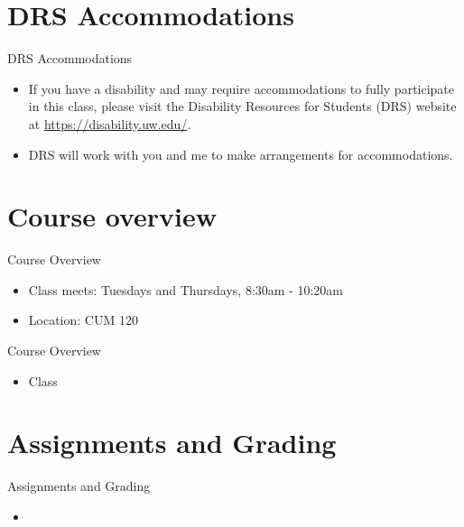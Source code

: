 \documentclass{beamer}
\begin{document}
\section{DRS Accommodations}

\begin{frame}{DRS Accommodations}
    \begin{itemize}

        \item If you have a disability and may require accommodations to fully participate in this class, please visit the Disability Resources for Students (DRS) website at \url{https://disability.uw.edu/}.
        \item DRS will work with you and me to make arrangements for accommodations.
    \end{itemize}
\end{frame}

\section{Course overview}


\begin{frame}{Course Overview}
    \begin{itemize}
        \item Class meets: Tuesdays and Thursdays, 8:30am - 10:20am
        \item Location: CUM 120
    \end{itemize}
\end{frame}

\begin{frame}{Course Overview}
    \begin{itemize}
        \item Class 
    \end{itemize}
\end{frame}

\section{Assignments and Grading}
\begin{frame}{Assignments and Grading}
    \begin{itemize}
        \item
    \end{itemize}
\end{frame}     
\end{document}
